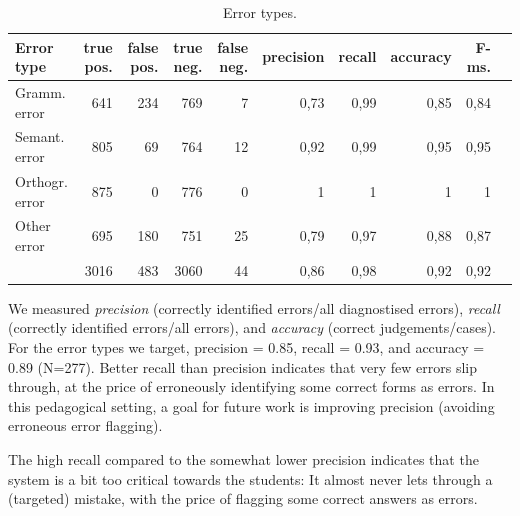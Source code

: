 \documentclass[11pt]{article}
\begin{document}
\begin{table}[hbtp]
\begin{center}
\begin{tabular}{|l|r|r|r|r||r|r|r|r|r|}
\hline
Error type	& true pos.		& false pos.		& true neg.		& false neg.	& precision	 & recall	& accuracy	& F-ms. \\
\hline
Gramm. error    &   641   &   234   &   769    &   7    &   0,73   &   0,99   &   0,85   &   0,84	  \\
Semant. error       &   805   &   69    &   764    &   12   &   0,92   &   0,99   &   0,95   &   0,95		  \\
Orthogr. error      &   875   &   0     &   776    &   0    &   1      &   1      &   1      &   1					  \\
Other error     &   695   &   180   &   751    &   25   &   0,79   &   0,97   &   0,88   &   0,87	  \\
\hline
  &   3016  &   483   &   3060   &   44   &   0,86   &   0,98   &   0,92   &   0,92			  \\
\hline
\end{tabular}
\caption{Error types.}
\label{errortypes}
\end{center}
\end{table}%

We measured \textit{precision} (correctly identified errors/all diagnostised errors), \textit{recall} (correctly identified errors/all errors), and \textit{accuracy} (correct judgements/cases). For the error types we target, precision = 0.85, recall = 0.93, and accuracy = 0.89 (N=277). Better recall than precision indicates that very few errors slip through, at the price of erroneously identifying some correct forms as errors. In this pedagogical setting, a goal for future work is improving precision (avoiding erroneous error flagging).

The high recall compared to the somewhat lower precision indicates that the system is a bit too critical towards the students: It almost never lets through a (targeted) mistake, with the price of flagging some correct answers as errors.
 
\end{document}
